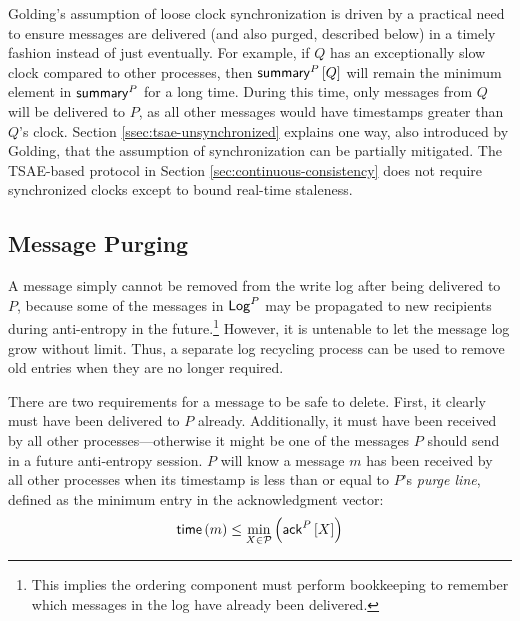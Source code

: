 \documentclass[]             %
{NASA}                       %
\theoremstyle{definition}
\begin{document}
Golding's assumption of loose clock synchronization is driven by a
practical need to ensure messages are delivered (and also purged,
described below) in a timely fashion instead of just eventually. For
example, if $Q$ has an exceptionally slow clock compared to other
processes, then $\mathsf{summary}^{P}\left[Q\right]$ will remain the minimum element in
$\mathsf{summary}^{P}$ for a long time. During this time, only messages from
$Q$ will be delivered to $P$, as all other messages would have
timestamps greater than $Q$'s clock. Section
\ref{ssec:tsae-unsynchronized} explains one way, also introduced by
Golding, that the assumption of synchronization can be partially
mitigated. The TSAE-based protocol in Section
\ref{sec:continuous-consistency} does not require synchronized clocks
except to bound real-time staleness.

\subsection{Message Purging}
\label{ssec:tsae-message-purging}
A message simply cannot be removed from the write log after being
delivered to $P$, because some of the messages in $\mathsf{Log}^{P}$ may be
propagated to new recipients during anti-entropy in the
future.\footnote{This implies the ordering component must perform
  bookkeeping to remember which messages in the log have already been
  delivered.} However, it is untenable to let the message log grow
without limit. Thus, a separate log recycling process can be used to
remove old entries when they are no longer required.

There are two requirements for a message to be safe to delete. First,
it clearly must have been delivered to $P$ already. Additionally, it
must have been received by all other processes---otherwise it might be
one of the messages $P$ should send in a future anti-entropy
session. $P$ will know a message $m$ has been received by all
other processes when its timestamp is less than or equal to $P$'s
\emph{purge line}, defined as the minimum entry in the acknowledgment
vector:
\begin{equation}
  \label{eq:tsae-message-purging-condition}
  \mathsf{time}\left(m\right) \leq \min_{X \in \mathcal{P}} \left( \mathsf{ack}^{P}\left[X\right] \right)
\end{equation}
\end{document}

